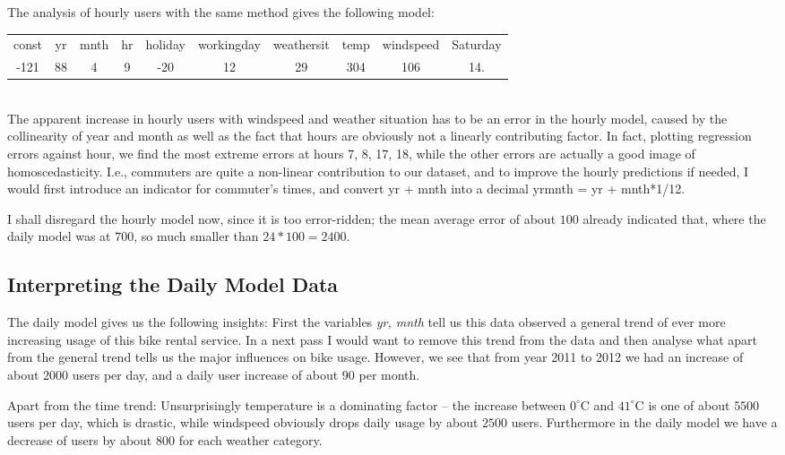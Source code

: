 \documentclass[11pt,oneside,a4paper]{scrartcl} %
\begin{document}
The analysis of hourly users with the same method gives the following model:\\[2pt]
\begin{adjustbox}{width = 1\textwidth}
\begin{tabular}{cccccccccc}
const & yr & mnth & hr& holiday & workingday & weathersit & temp & windspeed & Saturday\\
-121 &88 & 4 & 9 & -20& 12&29 &304 & 106 &14.\\
\end{tabular}
\end{adjustbox}\\[2pt]

The apparent increase in hourly users
with windspeed and weather situation has to be an error in the hourly model, caused by the 
collinearity of year and month as well as the fact that hours are obviously not a linearly 
contributing factor. In fact, plotting regression errors against hour, we find the most 
extreme errors at hours 7, 8, 17, 18, while the other errors are actually a good image 
of homoscedasticity. I.e., commuters are quite a non-linear contribution to our dataset, 
and to improve the hourly predictions if needed, I would first introduce an indicator 
for commuter's times, and convert yr + mnth into a decimal yrmnth = yr + mnth*1/12.

I shall disregard the hourly model now, since it is too error-ridden; the mean
average error of about $100$ already indicated that, where the daily model was at $700$,
so much smaller than $24*100=2400$.

\subsection*{Interpreting the Daily Model Data}
The daily model gives us the following insights:
First the variables {\it yr, mnth} tell us this data observed a general trend of ever more
increasing usage of this bike rental service. In a next pass I would want to remove this
trend from the data and then analyse what apart from the general trend tells us the 
major influences on bike usage. However, we see that from year 2011 to 2012 we had
an increase of about $2000$ users per day, and
a daily user increase of about $90$ per month. 

Apart from the time trend: Unsurprisingly temperature is a
dominating factor -- the increase between $0^{\circ} $C and $41^{\circ} $C is one of
about $5500$ users per day, which is drastic, while windspeed
obviously drops daily usage by about $2500$ users. 
Furthermore in the daily model we have a decrease of 
users by about $800$ for each weather category.
\end{document}
